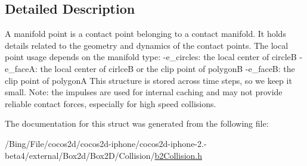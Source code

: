 \subsection{Detailed Description}
A manifold point is a contact point belonging to a contact manifold. It holds details related to the geometry and dynamics of the contact points. The local point usage depends on the manifold type\-: -\/e\-\_\-circles\-: the local center of circle\-B -\/e\-\_\-face\-A\-: the local center of cirlce\-B or the clip point of polygon\-B -\/e\-\_\-face\-B\-: the clip point of polygon\-A This structure is stored across time steps, so we keep it small. Note\-: the impulses are used for internal caching and may not provide reliable contact forces, especially for high speed collisions. 

The documentation for this struct was generated from the following file\-:\begin{DoxyCompactItemize}
\item 
/\-Bing/\-File/cocos2d/cocos2d-\/iphone/cocos2d-\/iphone-\/2.-\/beta4/external/\-Box2d/\-Box2\-D/\-Collision/\hyperlink{b2_collision_8h}{b2\-Collision.\-h}\end{DoxyCompactItemize}
